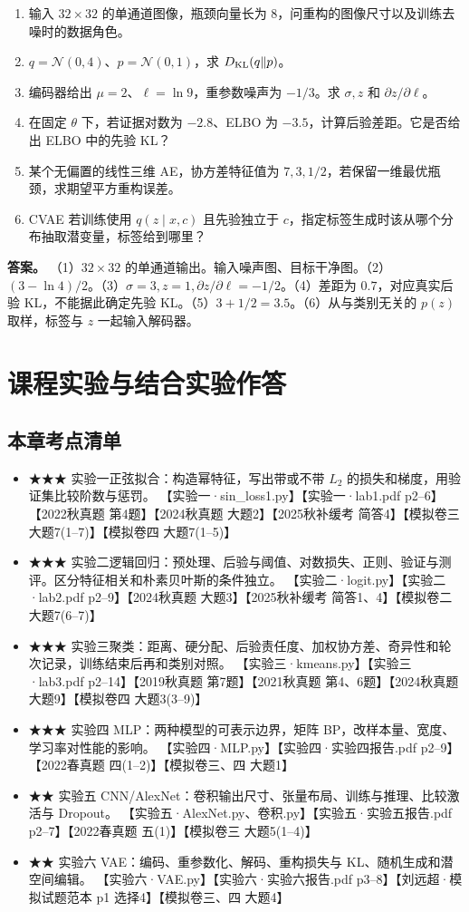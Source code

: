 \documentclass[UTF8,a4paper,zihao=-4,fontset=fandol]{ctexrep}
\begin{document}
\begin{enumerate}
\item 输入 $32\times32$ 的单通道图像，瓶颈向量长为 $8$，问重构的图像尺寸以及训练去噪时的数据角色。
\item $q=\mathcal N(0,4)$、$p=\mathcal N(0,1)$，求 $D_{\rm KL}(q\|p)$。
\item 编码器给出 $\mu=2$、$\ell=\ln9$，重参数噪声为 $-1/3$。求 $\sigma,z$ 和 $\partial z/\partial\ell$。
\item 在固定 $\theta$ 下，若证据对数为 $-2.8$、ELBO 为 $-3.5$，计算后验差距。它是否给出 ELBO 中的先验 KL？
\item 某个无偏置的线性三维 AE，协方差特征值为 $7,3,1/2$，若保留一维最优瓶颈，求期望平方重构误差。
\item CVAE 若训练使用 $q(z\mid x,c)$ 且先验独立于 $c$，指定标签生成时该从哪个分布抽取潜变量，标签给到哪里？
\end{enumerate}
\textbf{答案。} （1）$32\times32$ 的单通道输出。输入噪声图、目标干净图。（2）$(3-\ln4)/2$。（3）$\sigma=3,z=1,\partial z/\partial\ell=-1/2$。（4）差距为 $0.7$，对应真实后验 KL，不能据此确定先验 KL。（5）$3+1/2=3.5$。（6）从与类别无关的 $p(z)$ 取样，标签与 $z$ 一起输入解码器。

\chapter{课程实验与结合实验作答}

\section{本章考点清单}
\begin{itemize}
\item ★★★ 实验一正弦拟合：构造幂特征，写出带或不带 $L_2$ 的损失和梯度，用验证集比较阶数与惩罚。 【实验一·sin\_loss1.py】【实验一·lab1.pdf p2–6】【2022秋真题 第4题】【2024秋真题 大题2】【2025秋补缓考 简答4】【模拟卷三 大题7(1–7)】【模拟卷四 大题7(1–5)】
\item ★★★ 实验二逻辑回归：预处理、后验与阈值、对数损失、正则、验证与测评。区分特征相关和朴素贝叶斯的条件独立。 【实验二·logit.py】【实验二·lab2.pdf p2–9】【2024秋真题 大题3】【2025秋补缓考 简答1、4】【模拟卷二 大题7(6–7)】
\item ★★★ 实验三聚类：距离、硬分配、后验责任度、加权协方差、奇异性和轮次记录，训练结束后再和类别对照。 【实验三·kmeans.py】【实验三·lab3.pdf p2–14】【2019秋真题 第7题】【2021秋真题 第4、6题】【2024秋真题 大题9】【模拟卷四 大题3(3–9)】
\item ★★★ 实验四 MLP：两种模型的可表示边界，矩阵 BP，改样本量、宽度、学习率对性能的影响。 【实验四·MLP.py】【实验四·实验四报告.pdf p2–9】【2022春真题 四(1–2)】【模拟卷三、四 大题1】
\item ★★ 实验五 CNN/AlexNet：卷积输出尺寸、张量布局、训练与推理、比较激活与 Dropout。 【实验五·AlexNet.py、卷积.py】【实验五·实验五报告.pdf p2–7】【2022春真题 五(1)】【模拟卷三 大题5(1–4)】
\item ★★ 实验六 VAE：编码、重参数化、解码、重构损失与 KL、随机生成和潜空间编辑。 【实验六·VAE.py】【实验六·实验六报告.pdf p3–8】【刘远超·模拟试题范本 p1 选择4】【模拟卷三、四 大题4】
\end{itemize}
\end{document}
